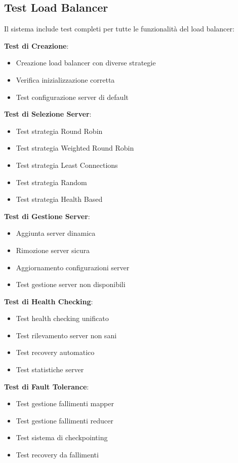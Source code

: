 \documentclass[12pt,a4paper]{article}
\begin{document}
\subsection{Test Load Balancer}

Il sistema include test completi per tutte le funzionalità del load balancer:

\textbf{Test di Creazione}:
\begin{itemize}
\item Creazione load balancer con diverse strategie
\item Verifica inizializzazione corretta
\item Test configurazione server di default
\end{itemize}

\textbf{Test di Selezione Server}:
\begin{itemize}
\item Test strategia Round Robin
\item Test strategia Weighted Round Robin
\item Test strategia Least Connections
\item Test strategia Random
\item Test strategia Health Based
\end{itemize}

\textbf{Test di Gestione Server}:
\begin{itemize}
\item Aggiunta server dinamica
\item Rimozione server sicura
\item Aggiornamento configurazioni server
\item Test gestione server non disponibili
\end{itemize}

\textbf{Test di Health Checking}:
\begin{itemize}
\item Test health checking unificato
\item Test rilevamento server non sani
\item Test recovery automatico
\item Test statistiche server
\end{itemize}

\textbf{Test di Fault Tolerance}:
\begin{itemize}
\item Test gestione fallimenti mapper
\item Test gestione fallimenti reducer
\item Test sistema di checkpointing
\item Test recovery da fallimenti
\end{itemize}
\end{document}
